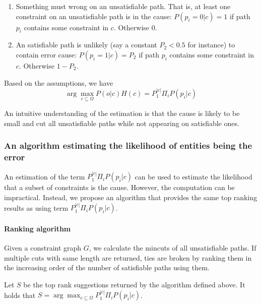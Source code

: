 \begin{enumerate}
\item Something must wrong on an unsatisfiable path. That is, at least one
constraint on an unsatisfiable path is in the cause: $P(p_i=0|c) = 1$ if path
$p_i$ contains some constraint in $c$. Otherwise 0.

\item An satisfiable path is unlikely (say a constant $P_2<0.5$ for instance)
to contain error cause: $P(p_i=1|c) = P_2$ if path $p_i$ contains some
constraint in $c$.  Otherwise $1-P_2$.  
\end{enumerate}

Based on the assumptions, we have
\[\arg\max_{c \subseteq \Omega} P(o|c) H(c) = P_1^{|c|} \Pi_i P(p_i|c) \]

An intuitive understanding of the estimation is that the cause is likely to be
small and cut all unsatisfiable paths while not appearing on satisfiable ones.

\subsubsection{An algorithm estimating the likelihood of entities being the error}
\label{sec:rankingalg}

An estimation of the term $P_1^{|c|} \Pi_i P(p_i|c)$ can be used to estimate
the likelihood that a subset of constraints is the cause. However, the
computation can be impractical. Instead, we propose an algorithm that provides
the same top ranking results as using term $P_1^{|c|} \Pi_i P(p_i|c)$.

\paragraph{Ranking algorithm}

Given a constraint graph $G$, we calculate the mincuts of all unsatisfiable
paths. If multiple cuts with same length are returned, ties are broken by
ranking them in the increasing order of the number of satisfiable paths using
them.

\begin{Theorem}
Let $S$ be the top rank suggestions returned by the algorithm defined above.
It holds that $S = \arg\max_{c\subseteq \Omega}P_1^{|c|} \Pi_i P(p_i|c)$.  
\end{Theorem}

